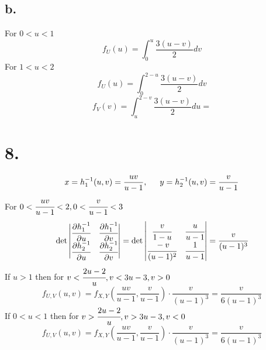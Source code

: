\documentclass[11pt]{article}
\begin{document}
\subsection*{b.}
For $0<u<1$
\[
    f_U(u) =  \int_0^{u} \frac{3(u-v)}{2} dv
\]
For $1<u<2$
\[
    f_U(u) =  \int_0^{2-u} \frac{3(u-v)}{2} dv
\]
\[
    f_V(v) = \int_u^{2-v} \frac{3(u-v)}{2} du =
\]
\pagebreak
\section*{8.}
\[
    x = h_1^{-1}(u,v) = \frac{uv}{u-1}, \indent y = h_2^{-1}(u,v) = \frac{v}{u-1}
\]
For $0<\cfrac{uv}{u-1}<2, 0<\cfrac{v}{u-1}<3$ 
\[
    \det 
    \begin{vmatrix}
        \cfrac{\partial h_1^{-1}}{\partial u} & \cfrac{\partial h_1^{-1}}{\partial v} \\
        \cfrac{\partial h_2^{-1}}{\partial u} & \cfrac{\partial h_2^{-1}}{\partial v}
    \end{vmatrix}    
    = 
    \det 
    \begin{vmatrix}
        \cfrac{v}{1-u} & \cfrac{u}{u-1} \\
        \cfrac{-v}{(u-1)^2} & \cfrac{1}{u-1} 
    \end{vmatrix}
    = \cfrac{v}{(u-1)^3}
\]
If $u>1$ then for $v<\cfrac{2u-2}{u}, v < 3u-3, v>0$ 
\[
    f_{U,V}(u,v) = f_{X,Y}\left(\frac{uv}{u-1}, \frac{v}{u-1}\right) \cdot \frac{v}{(u-1)^3} = \frac{v}{6(u-1)^3}
\]
If $0<u<1$ then for $v>\cfrac{2u-2}{u}, v>3u-3, v<0$
\[
    f_{U,V}(u,v) = f_{X,Y}\left(\frac{uv}{u-1}, \frac{v}{u-1}\right) \cdot \frac{v}{(u-1)^3} = \frac{v}{6(u-1)^3}
\]
\end{document}
